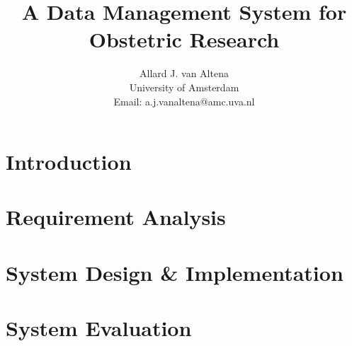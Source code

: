 \documentclass[a4paper]{report}
\title{A Data Management System for Obstetric Research}
\author{
	Allard J. van Altena\\
	University of Amsterdam\\
	Email: a.j.vanaltena@amc.uva.nl
}
\begin{document}
	

	
		
	\tableofcontents
	
	
	
	
	
	\chapter{Introduction}
	\label{introduction}
	
	
	
	
	
	\chapter{Requirement Analysis}
	\label{requirements}
	
	
	
	
	
	
	
	
	
	
	
	
	\chapter{System Design \& Implementation}
	\label{system-functionality}
	
	
	
	
	
	
	
	
	
	
	\chapter{System Evaluation}
	\label{evaluation}
	
	
	
	
\end{document}
